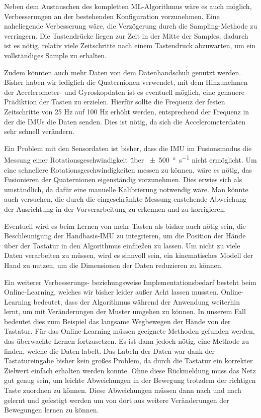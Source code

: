 Neben dem Austauschen des kompletten ML-Algorithmus wäre es auch möglich, Verbesserungen an der bestehenden Konfiguration vorzunehmen.
Eine naheliegende Verbesserung wäre, die Verzögerung durch die Sampling-Methode zu verringern. Die Tastendrücke liegen zur Zeit in der Mitte der Samples, dadurch ist es nötig, relativ viele Zeitschritte nach einem Tastendruck abzuwarten, um ein vollständiges Sample zu erhalten.

Zudem könnten auch mehr Daten von dem Datenhandschuh genutzt werden. Bisher haben wir lediglich die Quaternionen verwendet, mit dem Hinzunehmen der Accelerometer- und Gyroskopdaten ist es eventuell möglich, eine genauere Prädiktion der Tasten zu erzielen. Hierfür sollte die Frequenz der festen Zeitschritte von 25 Hz auf 100 Hz erhöht werden, entsprechend der Frequenz in der die IMUs die Daten senden. Dies ist nötig, da sich die Accelerometerdaten sehr schnell verändern.

Ein Problem mit den Sensordaten ist bisher, dass die IMU im Fusionsmodus die Messung einer Rotationsgeschwindigkeit über \SI{+-500}{\degree\per\second} nicht ermöglicht. Um eine schnellere Rotationsgeschwindigkeiten messen zu können, wäre es nötig, das Fusionieren der Quaternionen eigenständig vorzunehmen. Dies erwies sich als umständlich, da dafür eine manuelle Kalibrierung notwendig wäre. Man könnte auch versuchen, die durch die eingeschränkte Messung enstehende Abweichung der Ausrichtung in der Vorverarbeitung zu erkennen und zu korrigieren.

Eventuell wird es beim Lernen von mehr Tasten als bisher auch nötig sein, die Beschleunigung der Handbasis-IMU zu integrieren, um die Position der Hände über der Tastatur in den Algorithmus einfließen zu lassen.
Um nicht zu viele Daten verarbeiten zu müssen, wird es sinnvoll sein, ein kinematisches Modell der Hand zu nutzen, um die Dimensionen der Daten reduzieren zu können.

Ein weiterer Verbesserungs- beziehungsweise Implementationsbedarf besteht beim Online-Learning, welches wir bisher leider außer Acht lassen mussten. Online-Learning bedeutet, dass der Algorithmus während der Anwendung weiterhin lernt, um mit Veränderungen der Muster umgehen zu können. In unserem Fall bedeutet dies zum Beispiel das langsame Wegbewegen der Hände von der Tastatur. Für das Online-Learning müssen geeignete Methoden gefunden werden, das überwachte Lernen fortzusetzen. Es ist dann jedoch nötig, eine Methode zu finden, welche die Daten labelt. Das Labeln der Daten war dank der Tastatureingabe bisher kein großes Problem, da durch die Tastatur ein korrekter Zielwert einfach erhalten werden konnte. Ohne diese Rückmeldung muss das Netz gut genug sein, um leichte Abweichungen in der Bewegung trotzdem der richtigen Taste zuordnen zu können. Diese Abweichungen müssen dann nach und nach gelernt und gefestigt werden um von dort aus weitere Veränderungen der Bewegungen lernen zu können.

